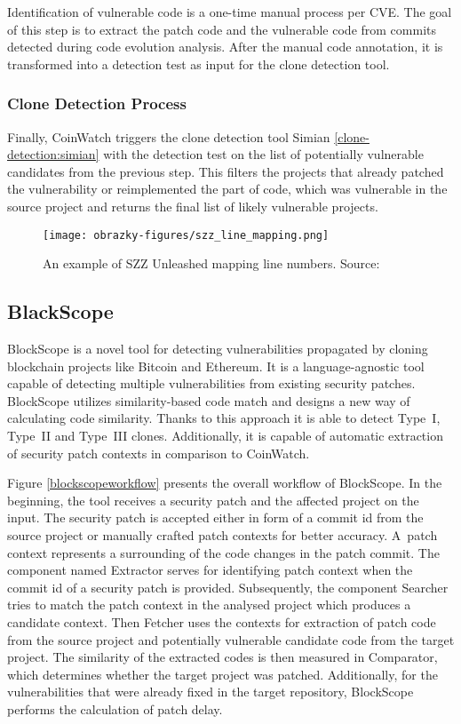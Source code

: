     Identification of vulnerable code is a one-time manual process per CVE. The goal of this step is to
    extract the patch code and the vulnerable code from commits detected during code evolution analysis.
    After the manual code annotation, it is transformed into a detection test as input for the clone detection
    tool.

    \subsubsection*{Clone Detection Process}
    Finally, CoinWatch triggers the clone detection tool Simian \ref{clone-detection:simian} with the detection
    test on the list of potentially vulnerable candidates from the previous step. This filters the projects
    that already patched the vulnerability or reimplemented the part of code, which was vulnerable in the
    source project and returns the final list of likely vulnerable projects.

  \begin{figure}[h]
      \centering
      \texttt{[image: obrazky-figures/szz\_line\_mapping.png]}
      \caption{An example of SZZ Unleashed mapping line numbers. Source:~\cite{SZZunleashed}}
      \label{szz-line-map}
  \end{figure}

  \subsection*{BlackScope}
    BlockScope is a novel tool for detecting vulnerabilities propagated by cloning blockchain projects like
    Bitcoin and Ethereum. It is a language-agnostic tool capable of detecting multiple vulnerabilities from
    existing security patches. BlockScope utilizes similarity-based code match and designs
    a new way of calculating code similarity. Thanks to this approach it is able to detect Type~I, Type~II and
    Type~III clones. Additionally, it is capable of automatic extraction of security patch contexts in comparison
    to CoinWatch.

    Figure \ref{blockscopeworkflow} presents the overall workflow of BlockScope. In the beginning,
    the tool receives a security patch and the affected project on the input. The security patch is accepted
    either in form of a commit id from the source project or manually crafted patch contexts for better accuracy.
    A~patch context represents a surrounding of the code changes in the patch commit. The component named
    Extractor serves for identifying patch context when the commit id of a security patch is provided.
    Subsequently, the component Searcher tries to match the patch context in the analysed project which produces
    a candidate context. Then Fetcher uses the contexts for extraction of patch code from the source project
    and potentially vulnerable candidate code from the target project. The similarity of the extracted
    codes is then measured in Comparator, which determines whether the target project was patched. Additionally,
    for the vulnerabilities that were already fixed in the target repository, BlockScope performs
    the calculation of patch delay.

